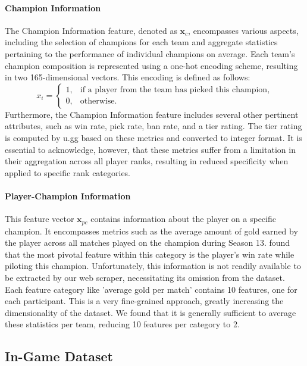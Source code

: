 \documentclass[12pt, a4paper, headinclude, twoside, plainheadsepline, open=right, numbers=noenddot, hidelinks, toc=listof, toc=bibliography]{scrreprt}
\begin{document}
\paragraph{Champion Information}
The Champion Information feature, denoted as $\mathbf{x}_c$, encompasses various aspects, including the selection of champions for each team and aggregate statistics pertaining to the performance of individual champions on average.
Each team's champion composition is represented using a one-hot encoding scheme, resulting in two 165-dimensional vectors.
This encoding is defined as follows:
\begin{equation}
\label{eq:champion_feature}
x_i = 
\begin{cases}
1, & \text{if a player from the team has picked this champion} , \\
0, & \text{otherwise.}
\end{cases}
\end{equation}
Furthermore, the Champion Information feature includes several other pertinent attributes, such as win rate, pick rate, ban rate, and a tier rating. 
The tier rating is computed by u.gg based on these metrics and converted to integer format.
It is essential to acknowledge, however, that these metrics suffer from a limitation in their aggregation across all player ranks, resulting in reduced specificity when applied to specific rank categories.

\paragraph{Player-Champion Information}
This feature vector $\mathbf{x}_{pc}$ contains information about the player on a specific champion.
It encompasses metrics such as the average amount of gold earned by the player across all matches played on the champion during Season 13. 
 \cite{costaFeatureAnalysisLeague2021} found that  the most pivotal feature within this category is the player's win rate while piloting this champion.
Unfortunately, this information is not readily available to be extracted by our web scraper,  necessitating its omission from the dataset.
Each feature category like 'average gold per match' contains 10 features, one for each participant.
This is a very fine-grained approach, greatly increasing the dimensionality of the dataset.
We found that it is generally sufficient to average these statistics per team, reducing 10 features per category to 2.

\subsection{In-Game Dataset}
\label{ssec:in_game_data}
\end{document}

